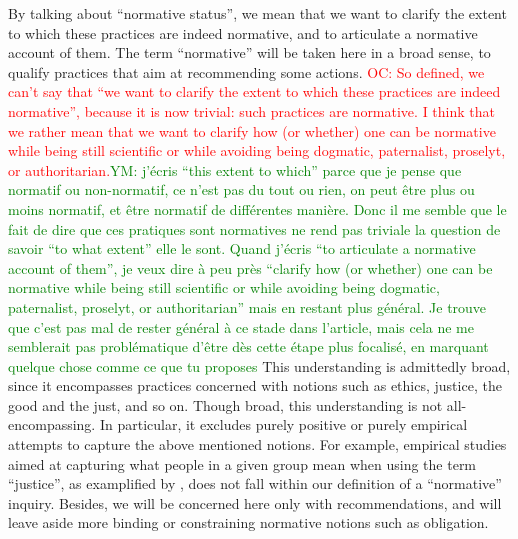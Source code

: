 \documentclass[preprint, french, english, 11pt, authoryear]{elsarticle}%
\newcommand{\commentYM}[1]{\textcolor{green}{YM: #1}}
\newcommand{\commentOC}[1]{\textcolor{red}{OC: #1}}
\begin{document}
By talking about “normative status”, we mean that we want to clarify the extent to which these practices are indeed normative, and to articulate a normative account of them. 
The term “normative” will be taken here in a broad sense, to qualify practices that aim at recommending some actions. 
\commentOC{So defined, we can’t say that “we want to clarify the extent to which these practices are indeed normative”, because it is now trivial: such practices are normative. I think that we rather mean that we want to clarify how (or whether) one can be normative while being still scientific or while avoiding being dogmatic, paternalist, proselyt, or authoritarian.}\commentYM{j'écris ``this extent to which'' parce que je pense que normatif ou non-normatif, ce n'est pas du tout ou rien, on peut être plus ou moins normatif, et être normatif de différentes manière. Donc il me semble que le fait de dire que ces pratiques sont normatives ne rend pas triviale la question de savoir ``to what extent'' elle le sont. Quand j'écris ``to articulate a normative account of them'', je veux dire à peu près ``clarify how (or whether) one can be normative while being still scientific or while avoiding being dogmatic, paternalist, proselyt, or authoritarian'' mais en restant plus général. Je trouve que c'est pas mal de rester général à ce stade dans l'article, mais cela ne me semblerait pas problématique d'être dès cette étape plus focalisé, en marquant quelque chose comme ce que tu proposes}
This understanding is admittedly broad, since it encompasses practices concerned with notions such as ethics, justice, the good and the just, and so on. 
Though broad, this understanding is not all-encompassing. In particular, it excludes purely positive or purely empirical attempts to capture the above mentioned notions. For example, empirical studies aimed at capturing what people in a given group mean when using the term “justice”, as examplified by \citet{gaertner_empirical_2012}, does not fall within our definition of a “normative” inquiry. Besides, we will be concerned here only with recommendations, and will leave aside more binding or constraining normative notions such as obligation.
\end{document}
